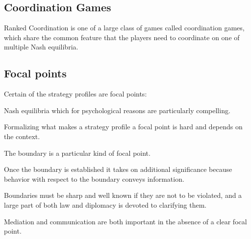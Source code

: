 \documentclass{article}
\begin{document}
\subsection{Coordination Games}

Ranked Coordination is one of a large class of games called coordination games,
which share the common feature that the players need to coordinate on one of multiple
Nash equilibria.

\subsection{Focal points}

Certain of the strategy profiles are
focal points: 

Nash equilibria which for psychological reasons are particularly compelling.

Formalizing what makes a strategy profile a focal point is hard and depends on the
context.

\hspace*{\fill}

The boundary is a particular kind of focal point.

Once the boundary is established it takes on additional significance because behavior
with respect to the boundary conveys information.

Boundaries must be sharp and well known if they are not to be violated, and
a large part of both law and diplomacy is devoted to clarifying them.

\hspace*{\fill}

Mediation and communication are both important in the absence of a clear focal
point.
\end{document}
